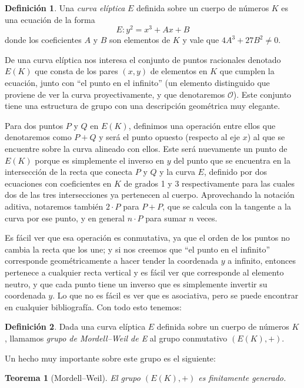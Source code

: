 \documentclass[a4paper]{book}
\theoremstyle{definition}
\newtheorem*{definition*}{Definición}
\theoremstyle{plain}
\newtheorem*{theorem*}{Teorema}
\newcommand{\OO}{\mathcal{O}}
\begin{document}
\begin{definition*}
Una \emph{curva elíptica} $E$ definida sobre un cuerpo de números $K$ es una ecuación de la forma 
\[
E: y^2 = x^3 + Ax + B
\]
donde los coeficientes $A$ y $B$ son elementos de $K$ y vale que $4 A^3+27 B^2 \neq 0$.
\end{definition*}

De una curva elíptica nos interesa el conjunto de puntos racionales denotado $E(K)$ que consta de los pares $(x,y)$ de elementos en $K$ que cumplen la ecuación, junto con ``el punto en el infinito'' (un elemento distinguido que proviene de ver la curva proyectivamente, y que denotaremos $\OO$). Este conjunto tiene una estructura de grupo con una descripción geométrica muy elegante.

Para dos puntos $P$ y $Q$ en $E(K)$, definimos una operación entre ellos que denotaremos como $P+Q$ y será el punto opuesto (respecto al eje $x$) al que se encuentre sobre la curva alineado con ellos. Este será nuevamente un punto de $E(K)$ porque es simplemente el inverso en $y$ del punto que se encuentra en la intersección de la recta que conecta $P$ y $Q$ y la curva $E$, definido por dos ecuaciones con coeficientes en $K$ de grados 1 y 3 respectivamente para las cuales dos de las tres intersecciones ya pertenecen al cuerpo. Aprovechando la notación aditiva, notaremos también $2 \cdot P$ para $P+P$, que se calcula con la tangente a la curva por ese punto, y en general $n\cdot P$ para sumar $n$ veces.

Es fácil ver que esa operación es conmutativa, ya que el orden de los puntos no cambia la recta que los une; y si nos creemos que ``el punto en el infinito'' corresponde geométricamente a hacer tender la coordenada $y$ a infinito, entonces pertenece a cualquier recta vertical y es fácil ver que corresponde al elemento neutro, y que cada punto tiene un inverso que es simplemente invertir su coordenada $y$. Lo que no es fácil es ver que es asociativa, pero se puede encontrar en cualquier bibliografía. Con todo esto tenemos:

\begin{definition*}
Dada una curva elíptica $E$ definida sobre un cuerpo de números $K$, llamamos \emph{grupo de Mordell--Weil de E} al grupo conmutativo $(E(K),+)$.
\end{definition*}

Un hecho muy importante sobre este grupo es el siguiente:

\begin{theorem*}[Mordell--Weil]
El grupo $(E(K),+)$ es finitamente generado.
\end{theorem*}
\end{document}
